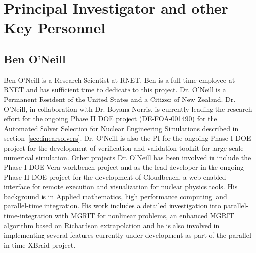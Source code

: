 \section{Principal Investigator and other Key Personnel}

\subsection{Ben O'Neill}
Ben O'Neill is a Research Scientist at RNET. Ben is a full time employee at
RNET and has sufficient time to dedicate to this project. Dr. O'Neill is a Permanent Resident of the United States 
and a Citizen of New Zealand. Dr. O'Neill, in collaboration with Dr. Boyana Norris, is currently leading the research effort for the  
ongoing Phase II DOE project (DE-FOA-001490) for the Automated Solver Selection for Nuclear Engineering 
Simulations described in section~\ref{sec:linearsolvers}. Dr. O'Neill is also the PI for the ongoing Phase I DOE project for 
the development of verification and validation toolkit for large-scale numerical simulation. Other projects Dr. O'Neill
has been involved in include the Phase I DOE Vera workbench project and as the lead developer in the ongoing Phase II 
DOE project for the development of Cloudbench, a web-enabled interface for remote execution and visualization for nuclear 
physics tools. His background is in Applied mathematics, high performance computing,
and parallel-time integration. His work includes a detailed investigation into parallel-time-integration
with MGRIT for nonlinear problems, an enhanced MGRIT algorithm based on Richardson extrapolation and he is also
involved in implementing several features currently under development as part of the parallel in time XBraid project.

